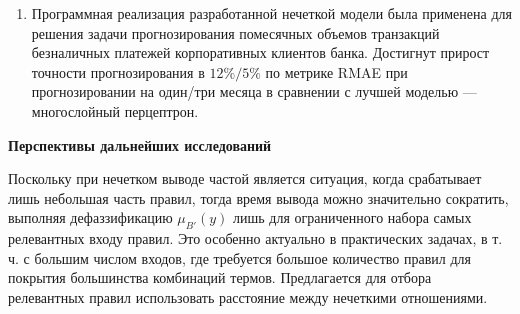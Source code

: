 \begin{enumerate}
  \item Программная реализация разработанной нечеткой модели была применена для решения задачи прогнозирования помесячных объемов транзакций безналичных платежей корпоративных клиентов банка. Достигнут прирост точности прогнозирования в $12\%/5\%$ по метрике RMAE при прогнозировании на один/три месяца в сравнении с лучшей моделью --- многослойный перцептрон. 
\end{enumerate}

\textbf{Перспективы дальнейших исследований}

Поскольку при нечетком выводе частой является ситуация, когда срабатывает лишь небольшая часть правил, тогда время вывода можно значительно сократить, выполняя дефаззификацию $\mu_{B'}(y)$ лишь для ограниченного набора самых релевантных входу правил. Это особенно актуально в практических задачах, в т. ч. с большим числом входов, где требуется большое количество правил для покрытия большинства комбинаций термов. Предлагается для отбора релевантных правил использовать расстояние между нечеткими отношениями.
